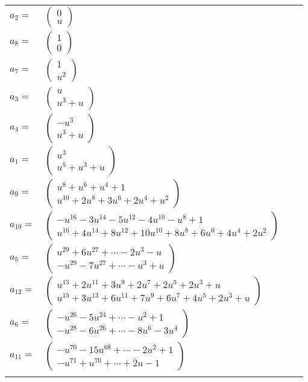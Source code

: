 \documentclass[1p]{elsarticle_modified}
\theoremstyle{definition}
\begin{document}
\begin{tabular}{m{7pt} m{180pt} m{7pt} m{180pt} }
\flushright $a_{2}=$&$\begin{pmatrix}0\\u\end{pmatrix}$ \\
\flushright $a_{8}=$&$\begin{pmatrix}1\\0\end{pmatrix}$ \\
\flushright $a_{7}=$&$\begin{pmatrix}1\\u^2\end{pmatrix}$ \\
\flushright $a_{3}=$&$\begin{pmatrix}u\\u^3+u\end{pmatrix}$ \\
\flushright $a_{4}=$&$\begin{pmatrix}- u^3\\u^3+u\end{pmatrix}$ \\
\flushright $a_{1}=$&$\begin{pmatrix}u^3\\u^5+u^3+u\end{pmatrix}$ \\
\flushright $a_{9}=$&$\begin{pmatrix}u^8+u^6+u^4+1\\u^{10}+2 u^8+3 u^6+2 u^4+u^2\end{pmatrix}$ \\
\flushright $a_{10}=$&$\begin{pmatrix}- u^{16}-3 u^{14}-5 u^{12}-4 u^{10}- u^8+1\\u^{16}+4 u^{14}+8 u^{12}+10 u^{10}+8 u^8+6 u^6+4 u^4+2 u^2\end{pmatrix}$ \\
\flushright $a_{5}=$&$\begin{pmatrix}u^{29}+6 u^{27}+\cdots-2 u^3- u\\- u^{29}-7 u^{27}+\cdots- u^3+u\end{pmatrix}$ \\
\flushright $a_{12}=$&$\begin{pmatrix}u^{13}+2 u^{11}+3 u^9+2 u^7+2 u^5+2 u^3+u\\u^{15}+3 u^{13}+6 u^{11}+7 u^9+6 u^7+4 u^5+2 u^3+u\end{pmatrix}$ \\
\flushright $a_{6}=$&$\begin{pmatrix}- u^{26}-5 u^{24}+\cdots- u^2+1\\- u^{28}-6 u^{26}+\cdots-8 u^6-3 u^4\end{pmatrix}$ \\
\flushright $a_{11}=$&$\begin{pmatrix}- u^{70}-15 u^{68}+\cdots-2 u^2+1\\- u^{71}+u^{70}+\cdots+2 u-1\end{pmatrix}$\\&\end{tabular}
\end{document}
